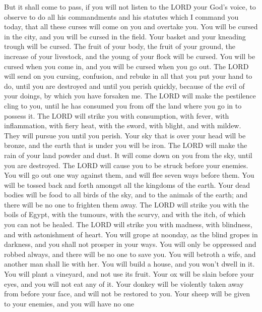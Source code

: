  But it shall come to pass, if you will not listen to the
LORD your God's voice, to observe to do all his commandments and his
statutes which I command you today, that all these curses will come on
you and overtake you.  You will be cursed in the city, and
you will be cursed in the field.  Your basket and your
kneading trough will be cursed.  The fruit of your body,
the fruit of your ground, the increase of your livestock, and the young
of your flock will be cursed.  You will be cursed when you
come in, and you will be cursed when you go out.  The LORD
will send on you cursing, confusion, and rebuke in all that you put your
hand to do, until you are destroyed and until you perish quickly,
because of the evil of your doings, by which you have forsaken me.
 The LORD will make the pestilence cling to you, until he
has consumed you from off the land where you go in to possess it.
 The LORD will strike you with consumption, with fever,
with inflammation, with fiery heat, with the sword, with blight, and
with mildew. They will pursue you until you perish.  Your
sky that is over your head will be bronze, and the earth that is under
you will be iron.  The LORD will make the rain of your land
powder and dust. It will come down on you from the sky, until you are
destroyed.  The LORD will cause you to be struck before
your enemies. You will go out one way against them, and will flee seven
ways before them. You will be tossed back and forth amongst all the
kingdoms of the earth.  Your dead bodies will be food to
all birds of the sky, and to the animals of the earth; and there will be
no one to frighten them away.  The LORD will strike you
with the boils of Egypt, with the tumours, with the scurvy, and with the
itch, of which you can not be healed.  The LORD will strike
you with madness, with blindness, and with astonishment of heart.
 You will grope at noonday, as the blind gropes in
darkness, and you shall not prosper in your ways. You will only be
oppressed and robbed always, and there will be no one to save you.
 You will betroth a wife, and another man shall lie with
her. You will build a house, and you won't dwell in it. You will plant a
vineyard, and not use its fruit.  Your ox will be slain
before your eyes, and you will not eat any of it. Your donkey will be
violently taken away from before your face, and will not be restored to
you. Your sheep will be given to your enemies, and you will have no one
